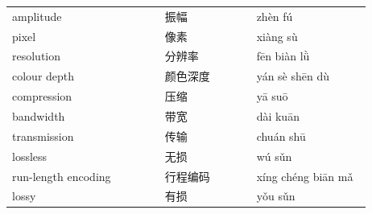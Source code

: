 \documentclass[11pt]{article}
\begin{document}
\begin{longtable}{@{}p{0.40\linewidth}p{0.24\linewidth}p{0.30\linewidth}@{}}
amplitude & 振幅 & zhèn fú \\
pixel & 像素 & xiàng sù \\
resolution & 分辨率 & fēn biàn lǜ \\
colour depth & 颜色深度 & yán sè shēn dù \\
compression & 压缩 & yā suō \\
bandwidth & 带宽 & dài kuān \\
transmission & 传输 & chuán shū \\
lossless & 无损 & wú sǔn \\
run-length encoding & 行程编码 & xíng chéng biān mǎ \\
lossy & 有损 & yǒu sǔn \\
\end{longtable}
\end{document}
